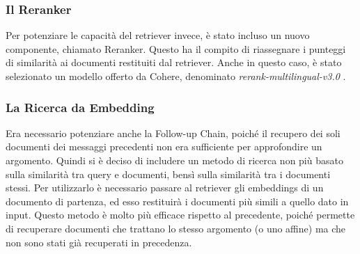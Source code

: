 \subsubsection{Il Reranker}
Per potenziare le capacità del retriever invece, è stato incluso un nuovo componente, chiamato Reranker. Questo ha il compito di riassegnare i punteggi di similarità ai documenti restituiti dal retriever. Anche in questo caso, è stato selezionato un modello offerto da Cohere, denominato \textit{rerank-multilingual-v3.0} \cite{coherererank}.

\subsubsection{La Ricerca da Embedding}
Era necessario potenziare anche la Follow-up Chain, poiché il recupero dei soli documenti dei messaggi precedenti non era sufficiente per approfondire un argomento. Quindi si è deciso di includere un metodo di ricerca non più basato sulla similarità tra query e documenti, bensì sulla similarità tra i documenti stessi. Per utilizzarlo è necessario passare al retriever gli embeddings di un documento di partenza, ed esso restituirà i documenti più simili a quello dato in input. Questo metodo è molto più efficace rispetto al precedente, poiché permette di recuperare documenti che trattano lo stesso argomento (o uno affine) ma che non sono stati già recuperati in precedenza.


